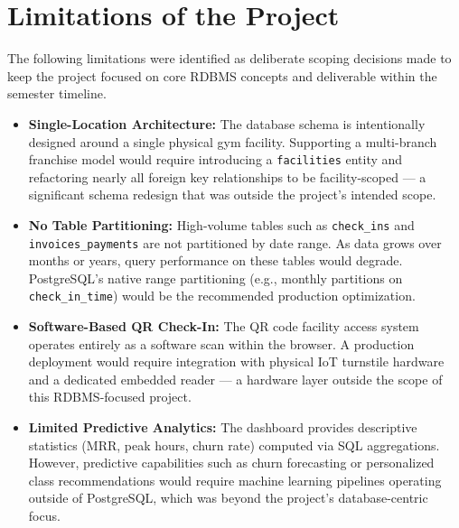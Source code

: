 \documentclass[12pt,a4paper]{article}
\begin{document}
\newpage
\section{Limitations of the Project}
The following limitations were identified as deliberate scoping decisions made to keep the project focused on core RDBMS concepts and deliverable within the semester timeline.
\begin{itemize}[leftmargin=*]
    \item \textbf{Single-Location Architecture:} The database schema is intentionally designed around a single physical gym facility. Supporting a multi-branch franchise model would require introducing a \texttt{facilities} entity and refactoring nearly all foreign key relationships to be facility-scoped — a significant schema redesign that was outside the project's intended scope.


    \item \textbf{No Table Partitioning:} High-volume tables such as \texttt{check\_ins} and \texttt{invoices\_payments} are not partitioned by date range. As data grows over months or years, query performance on these tables would degrade. PostgreSQL's native range partitioning (e.g., monthly partitions on \texttt{check\_in\_time}) would be the recommended production optimization.

    \item \textbf{Software-Based QR Check-In:} The QR code facility access system operates entirely as a software scan within the browser. A production deployment would require integration with physical IoT turnstile hardware and a dedicated embedded reader — a hardware layer outside the scope of this RDBMS-focused project.

    \item \textbf{Limited Predictive Analytics:} The dashboard provides descriptive statistics (MRR, peak hours, churn rate) computed via SQL aggregations. However, predictive capabilities such as churn forecasting or personalized class recommendations would require machine learning pipelines operating outside of PostgreSQL, which was beyond the project's database-centric focus.
\end{itemize}
\end{document}
